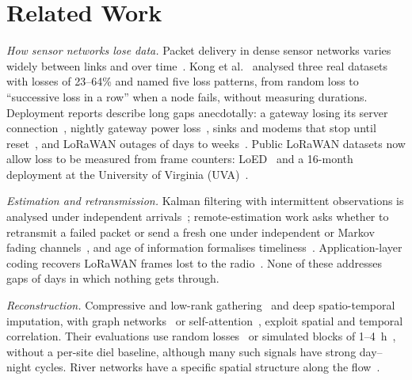\section{Related Work}
\label{sec:related}

\emph{How sensor networks lose data.} Packet delivery in dense sensor networks varies widely between links and over time~\cite{zhao2003understanding}. Kong et al.~\cite{kong2014dataloss} analysed three real datasets with losses of 23--64\% and named five loss patterns, from random loss to ``successive loss in a row'' when a node fails, without measuring durations. Deployment reports describe long gaps anecdotally: a gateway losing its server connection~\cite{ledinh2007design}, nightly gateway power loss~\cite{langendoen2006murphy}, sinks and modems that stop until reset~\cite{ingelrest2010sensorscope,brzozowski2018lessons}, and LoRaWAN outages of days to weeks~\cite{puluckul2025subarctic}. Public LoRaWAN datasets now allow loss to be measured from frame counters: LoED~\cite{bhatia2020loed} and a 16-month deployment at the University of Virginia (UVA)~\cite{nikseresht2025uva}.

\emph{Estimation and retransmission.} Kalman filtering with intermittent observations is analysed under independent arrivals~\cite{sinopoli2004kalman}; remote-estimation work asks whether to retransmit a failed packet or send a fresh one under independent or Markov fading channels~\cite{huang2019retransmit,huang2020harq}, and age of information formalises timeliness~\cite{yates2021aoi,sun2026overlapping}. Application-layer coding recovers LoRaWAN frames lost to the radio~\cite{marcelis2017dare}. None of these addresses gaps of days in which nothing gets through.

\emph{Reconstruction.} Compressive and low-rank gathering~\cite{luo2009cdg,cheng2013stcdg,piao2014lowrank} and deep spatio-temporal imputation, with graph networks~\cite{cini2022grin,marisca2022spin,cao2020stemgnn,jing2024casper} or self-attention~\cite{du2023saits,nie2024imputeformer}, exploit spatial and temporal correlation. Their evaluations use random losses~\cite{chang2023deepcs} or simulated blocks of 1--4~h~\cite{cini2022grin,marisca2022spin}, without a per-site diel baseline, although many such signals have strong day--night cycles. River networks have a specific spatial structure along the flow~\cite{peterson2010mixed}.

